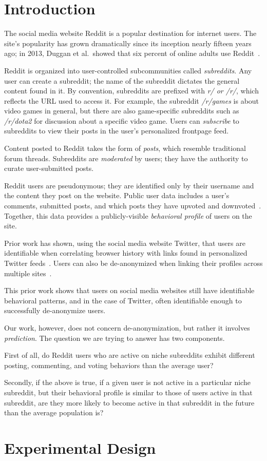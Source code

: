 \documentclass[10pt]{article}
\begin{document}
\section{Introduction}

The social media website Reddit is a popular destination for internet users. The site's popularity has grown dramatically since its inception nearly fifteen years ago; in 2013, Duggan et al.\ showed that six percent of online adults use Reddit~\cite{pewsixpercent}.

Reddit is organized into user-controlled subcommunities called \textit{subreddits}. Any user can create a subreddit; the name of the subreddit dictates the general content found in it. By convention, subreddits are prefixed with \textit{r/ or /r/}, which reflects the URL used to access it. For example, the subreddit \textit{/r/games} is about video games in general, but there are also game-specific subreddits such as \textit{/r/dota2} for discussion about a specific video game. Users can \textit{subscribe} to subreddits to view their posts in the user's personalized frontpage feed.

Content posted to Reddit takes the form of \textit{posts}, which resemble traditional forum threads. Subreddits are \textit{moderated} by users; they have the authority to curate user-submitted posts.

Reddit users are pseudonymous; they are identified only by their username and the content they post on the website. Public user data includes a user's comments, submitted posts, and which posts they have upvoted and downvoted~\cite{redditapi}. Together, this data provides a publicly-visible \textit{behavioral profile} of users on the site.

Prior work has shown, using the social media website Twitter, that users are identifiable when correlating browser history with links found in personalized Twitter feeds~\cite{su2017deanonymizingweb}. Users can also be de-anonymized when linking their profiles across multiple sites~\cite{}\cite{}.

This prior work shows that users on social media websites still have identifiable behavioral patterns, and in the case of Twitter, often identifiable enough to successfully de-anonymize users.

Our work, however, does not concern de-anonymization, but rather it involves \textit{prediction}. The question we are trying to answer has two components.

First of all, do Reddit users who are active on niche subreddits exhibit different posting, commenting, and voting behaviors than the average user?

Secondly, if the above is true, if a given user is not active in a particular niche subreddit, but their behavioral profile is similar to those of users active in that subreddit, are they more likely to become active in that subreddit in the future than the average population is?

\section{Experimental Design}



\end{document}
